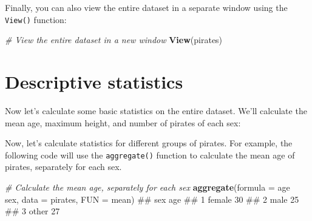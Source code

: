 \documentclass[]{book}
\newenvironment{Shaded}{\begin{snugshade}}{\end{snugshade}}
\newcommand{\KeywordTok}[1]{\textcolor[rgb]{0.13,0.29,0.53}{\textbf{#1}}}
\newcommand{\DataTypeTok}[1]{\textcolor[rgb]{0.13,0.29,0.53}{#1}}
\newcommand{\StringTok}[1]{\textcolor[rgb]{0.31,0.60,0.02}{#1}}
\newcommand{\CommentTok}[1]{\textcolor[rgb]{0.56,0.35,0.01}{\textit{#1}}}
\newcommand{\OperatorTok}[1]{\textcolor[rgb]{0.81,0.36,0.00}{\textbf{#1}}}
\newcommand{\NormalTok}[1]{#1}
\theoremstyle{definition}
\theoremstyle{definition}
\theoremstyle{remark}
\begin{document}
Finally, you can also view the entire dataset in a separate window using
the \texttt{View()} function:

\begin{Shaded}
\begin{Highlighting}[]
\CommentTok{# View the entire dataset in a new window}
\KeywordTok{View}\NormalTok{(pirates)}
\end{Highlighting}
\end{Shaded}

\section{Descriptive statistics}\label{descriptive-statistics}

Now let's calculate some basic statistics on the entire dataset. We'll
calculate the mean age, maximum height, and number of pirates of each
sex:

\begin{Shaded}
\end{Shaded}

Now, let's calculate statistics for different groups of pirates. For
example, the following code will use the \texttt{aggregate()} function
to calculate the mean age of pirates, separately for each sex.

\begin{Shaded}
\begin{Highlighting}[]
\CommentTok{# Calculate the mean age, separately for each sex}
\KeywordTok{aggregate}\NormalTok{(}\DataTypeTok{formula =}\NormalTok{ age }\OperatorTok{~}\StringTok{ }\NormalTok{sex,}
          \DataTypeTok{data =}\NormalTok{ pirates,}
          \DataTypeTok{FUN =}\NormalTok{ mean)}
\NormalTok{##      sex age}
\NormalTok{## 1 female  30}
\NormalTok{## 2   male  25}
\NormalTok{## 3  other  27}
\end{Highlighting}
\end{Shaded}
\end{document}
